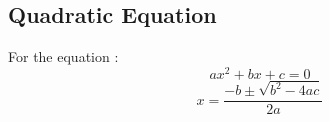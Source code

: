 \documentclass[12pt, a5paper]{article}
\begin{document}
\subsection*{Quadratic Equation}
\noindent For the equation :
$$ax^2 + bx + c = 0$$
$$x = \dfrac{-b \pm \sqrt{b^2 - 4ac}}{2a}$$
\end{document}
